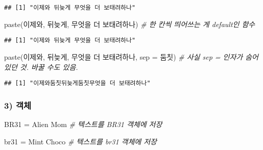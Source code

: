 \documentclass[
  12,
]{article}
\newenvironment{Shaded}{\begin{snugshade}}{\end{snugshade}}
\newcommand{\AttributeTok}[1]{\textcolor[rgb]{0.77,0.63,0.00}{#1}}
\newcommand{\CommentTok}[1]{\textcolor[rgb]{0.56,0.35,0.01}{\textit{#1}}}
\newcommand{\FunctionTok}[1]{\textcolor[rgb]{0.00,0.00,0.00}{#1}}
\newcommand{\NormalTok}[1]{#1}
\newcommand{\OtherTok}[1]{\textcolor[rgb]{0.56,0.35,0.01}{#1}}
\newcommand{\StringTok}[1]{\textcolor[rgb]{0.31,0.60,0.02}{#1}}
\begin{document}
\begin{verbatim}
## [1] "이제와 뒤늦게 무엇을 더 보태려하나"
\end{verbatim}

\begin{Shaded}
\begin{Highlighting}[]
\FunctionTok{paste}\NormalTok{(}\StringTok{\textquotesingle{}이제와\textquotesingle{}}\NormalTok{, }\StringTok{\textquotesingle{}뒤늦게\textquotesingle{}}\NormalTok{, }\StringTok{\textquotesingle{}무엇을 더 보태려하나\textquotesingle{}}\NormalTok{) }\CommentTok{\# 한 칸씩 띄어쓰는 게 default인 함수}
\end{Highlighting}
\end{Shaded}

\begin{verbatim}
## [1] "이제와 뒤늦게 무엇을 더 보태려하나"
\end{verbatim}

\begin{Shaded}
\begin{Highlighting}[]
\FunctionTok{paste}\NormalTok{(}\StringTok{\textquotesingle{}이제와\textquotesingle{}}\NormalTok{, }\StringTok{\textquotesingle{}뒤늦게\textquotesingle{}}\NormalTok{, }\StringTok{\textquotesingle{}무엇을 더 보태려하나\textquotesingle{}}\NormalTok{, }\AttributeTok{sep =} \StringTok{\textquotesingle{}둠칫\textquotesingle{}}\NormalTok{) }\CommentTok{\# 사실 sep = \textquotesingle{} \textquotesingle{} 인자가 숨어있던 것. 바꿀 수도 있음.}
\end{Highlighting}
\end{Shaded}

\begin{verbatim}
## [1] "이제와둠칫뒤늦게둠칫무엇을 더 보태려하나"
\end{verbatim}

\hypertarget{uxac1duxccb4}{%
\subsubsection{3) 객체}\label{uxac1duxccb4}}

\begin{Shaded}
\begin{Highlighting}[]
\NormalTok{BR31 }\OtherTok{=} \StringTok{\textquotesingle{}Alien Mom\textquotesingle{}} \CommentTok{\# 텍스트를 BR31 객체에 저장}

\NormalTok{br31 }\OtherTok{=} \StringTok{\textquotesingle{}Mint Choco\textquotesingle{}} \CommentTok{\# 텍스트를 br31 객체에 저장}
\end{Highlighting}
\end{Shaded}
\end{document}
